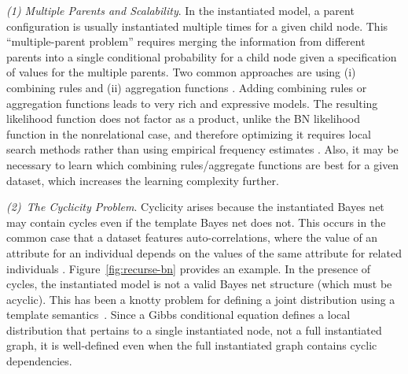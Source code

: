 \documentclass[twoside,11pt]{article}
\newcommand{\point}[1]{\noindent\emph{#1}.}
\begin{document}
\point{(1) Multiple Parents and Scalability} In the instantiated model, a parent configuration is usually instantiated multiple times for a given child node. This ``multiple-parent problem'' \cite{Natarajan2008} requires merging the information from different parents into a single conditional probability for a child node given a specification of values for the multiple parents. Two common approaches are using (i) combining rules \cite{Kersting2007} and (ii) aggregation functions \cite{Getoor2007c}. Adding combining rules or aggregation functions leads to very rich and expressive models. The resulting likelihood function does not factor as a product, unlike the BN likelihood function in the nonrelational case, and therefore optimizing it requires local search methods rather than using empirical frequency estimates  \cite{Kersting2007,Natarajan2009}. Also, it may be necessary to learn which combining rules/aggregate functions are best for a given dataset, which increases the learning complexity further.


\point{(2)~The Cyclicity Problem} Cyclicity arises because the instantiated Bayes net may contain cycles even if the template Bayes net does not.
This occurs in the common case that a dataset features auto-correlations, where the value of an attribute for an individual depends on the values of the same attribute for related individuals \cite{Neville2007,Schulte2012a}. Figure~\ref{fig:recurse-bn}  provides an example.
In the presence of cycles, the instantiated model is not a valid Bayes net structure (which must be acyclic).
This has been a knotty problem for defining a joint distribution using a template semantics~\cite{Domingos2007,Taskar2002,Getoor2007c}. Since a Gibbs conditional equation defines a local distribution that pertains to a single instantiated node, not a full instantiated graph, it is well-defined even when the full instantiated graph contains cyclic dependencies.
\end{document}
